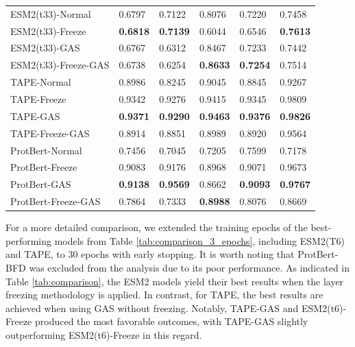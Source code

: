 \begin{table}[h]
\begin{tabular}{llllll}
		
		ESM2(t33)-Normal            & 0.6797                 & 0.7122                  & 0.8076               & 0.7220                 & 0.7458               %
		\\
		ESM2(t33)-Freeze     & \textbf{0.6818}   & \textbf{0.7139}    & 0.6044          & 0.6546            & \textbf{0.7613} %
		\\
		ESM2(t33)-GAS        & 0.6767            & 0.6312             & 0.8467          & 0.7233            & 0.7442         %
		\\
		ESM2(t33)-Freeze-GAS & 0.6738            & 0.6254             & \textbf{0.8633} & \textbf{0.7254}   & 0.7514          %
		\\ \hline
		
		
		TAPE-Normal             & 0.8986                 & 0.8245                  & 0.9045               & 0.8845                 & 0.9267                           
		\\
		TAPE-Freeze          & 0.9342            & 0.9276             & 0.9415          & 0.9345            & 0.9809          %
		\\
		TAPE-GAS             & \textbf{0.9371}   & \textbf{0.9290}    & \textbf{0.9463} & \textbf{0.9376}   & \textbf{0.9826} %
		\\
		TAPE-Freeze-GAS      & 0.8914            & 0.8851             & 0.8989          & 0.8920            & 0.9564          %
		\\ \hline
		
		
		ProtBert-Normal          & 0.7456                 & 0.7045                  & 0.7205               & 0.7599                 & 0.7178               %
		\\
		ProtBert-Freeze      & 0.9083            & 0.9176             & 0.8968          & 0.9071            & 0.9673          %
		\\
		ProtBert-GAS         & \textbf{0.9138}   & \textbf{0.9569}    & 0.8662          & \textbf{0.9093}   & \textbf{0.9767} %
		\\
		ProtBert-Freeze-GAS  & 0.7864            & 0.7333             & \textbf{0.8988} & 0.8076            & 0.8669          %
		\\ \hline
	\end{tabular}
\end{table}



For a more detailed comparison, we extended the training epochs of the best-performing models from Table \ref{tab:comparison_3_epochs}, including ESM2(T6) and TAPE, to 30 epochs with early stopping. It is worth noting that ProtBert-BFD was excluded from the analysis due to its poor performance. As indicated in Table \ref{tab:comparison}, the ESM2 models yield their best results when the layer freezing methodology is applied. In contrast, for TAPE, the best results are achieved when using GAS without freezing. Notably, TAPE-GAS and ESM2(t6)-Freeze produced the most favorable outcomes, with TAPE-GAS slightly outperforming ESM2(t6)-Freeze in this regard.




